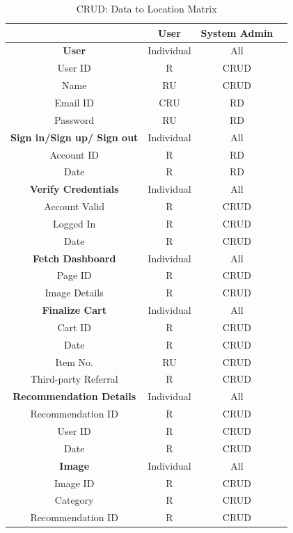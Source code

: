 \begin{table}[H]
\centering
\begin{tabular}{ |c|c|c|c| } 
\hline
 & User & System Admin \\
\hline
\textbf{User} & Individual & All \\ \hline
User ID & R & CRUD \\ 
Name & RU & CRUD \\ 
Email ID & CRU & RD \\
Password & RU & RD \\
\hline
\textbf{Sign in/Sign up/ Sign out} & Individual & All \\ \hline
Account ID & R	& RD \\ 
Date &	R	& RD \\
\hline
\textbf{Verify Credentials} &	Individual	& All \\ \hline
Account Valid &	R &	CRUD \\
Logged In &	R &	CRUD \\
Date &	R &	CRUD \\
\hline
\textbf{Fetch Dashboard} &	Individual &	All \\ \hline
Page ID	& R	& CRUD \\
Image Details &	R &	CRUD\\ \hline
\textbf{Finalize Cart} &	Individual	& All \\ \hline
Cart ID	& R & CRUD \\
Date &	R &	CRUD \\
Item No. &	RU & CRUD \\
Third-party Referral &	R & CRUD \\ \hline
\textbf{Recommendation Details}	& Individual &	All \\ \hline
Recommendation ID &	R &	CRUD \\
User ID	& R & CRUD \\
Date &	R & CRUD \\ \hline
\textbf{Image} &	Individual	& All \\ \hline
Image ID &	R	& CRUD \\
Category & R & CRUD \\
Recommendation ID &	R &	CRUD \\ \hline

\hline
\end{tabular}
\caption{CRUD: Data to Location Matrix}
\label{crud:dToL}
\end{table}

